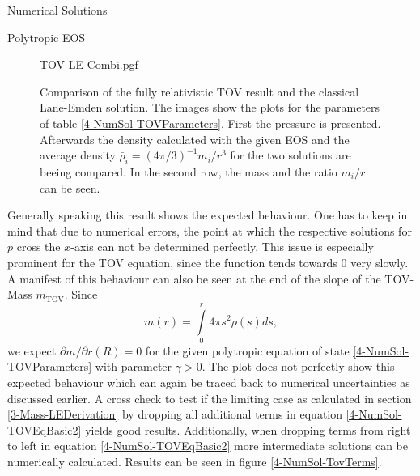 \begin{section}{Numerical Solutions}
\begin{subsection}{Polytropic EOS}
\begin{figure}[ht]
	\centering
	{TOV-LE-Combi.pgf}
	\caption[Comparison TOV and LE equation]{Comparison of the fully relativistic TOV result and the classical Lane-Emden solution. The images show the plots for the parameters of table \ref{4-NumSol-TOVParameters}. First the pressure is presented. Afterwards the density calculated with the given EOS and the average density $\bar{\rho}_i=(4\pi/3)^{-1}m_i/r^3$ for the two solutions are beeing compared. In the second row, the mass and the ratio $m_i/r$ can be seen.}
	\label{4-NumSol-TOVEqEasyEOS}
\end{figure}\noindent
Generally speaking this result shows the expected behaviour. One has to keep in mind that due to numerical errors, the point at which the respective solutions for $p$ cross the $x$-axis can not be determined perfectly. This issue is especially prominent for the TOV equation, since the function tends towards $0$ very slowly.\\
A manifest of this behaviour can also be seen at the end of the slope of the TOV-Mass $m_{\text{TOV}}$. Since
\begin{equation}
	m(r) = \int\limits_0^r 4\pi s^2\rho(s)ds,
\end{equation}
we expect $\partial m/\partial r(R)=0$ for the given polytropic equation of state \ref{4-NumSol-TOVParameters} with parameter $\gamma>0$. The plot does not perfectly show this expected behaviour which can again be traced back to numerical uncertainties as discussed earlier.
A cross check to test if the limiting case as calculated in section \ref{3-Mass-LEDerivation} by dropping all additional terms in equation \ref{4-NumSol-TOVEqBasic2} yields good results. Additionally, when dropping terms from right to left in equation \ref{4-NumSol-TOVEqBasic2} more intermediate solutions can be numerically calculated. Results can be seen in figure \ref{4-NumSol-TovTerms}.

\end{subsection}
\end{section}
